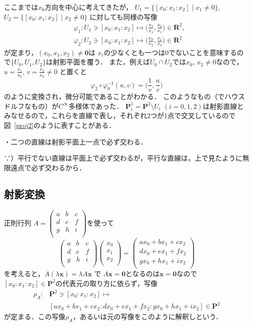 ここまでは$x_0$方向を中心に考えてきたが，
$U_1=\{[x_0:x_1:x_2]\mid x_1\neq 0\}$, $U_2=\{[x_0:x_1:x_2]\mid x_2\neq 0\}$ に対しても同様の写像
\[
\begin{split}
	&\varphi_1:U_1\ni [x_0:x_1:x_2]
	\mapsto 
	\biggl(\frac{x_0}{x_1},\frac{x_2}{x_1}\biggr)\in \mathbf R^2,\\
	&\varphi_2:U_2\ni [x_0:x_1:x_2]
	\mapsto 
	\biggl(\frac{x_0}{x_2},\frac{x_1}{x_2}\biggr)\in \mathbf R^2
\end{split}
\]
が定まり，$(x_0,x_1,x_2)\neq \mathbf 0$は $x_i$の少なくとも一つは$0$でないことを意味するので$\{U_0, U_1, U_2\}$は射影平面を覆う．
また，例えば$U_0\cap U_2$では$x_0$, $x_2\neq 0$なので，
 $u=\frac{x_1}{x_0}$, $v=\frac{x_2}{x_0}\neq 0$ と置くと
\[
	\varphi_2\circ\varphi_0^{-1}(u,v)
	=
	\biggl(\frac{1}{v},\frac{u}{v}\biggr)
\]
のように変換され，微分可能であることがわかる．
このようなもの（でハウスドルフなもの）が$C^\infty$多様体であった．
$\mathbf P^1_i=\mathbf P^2\setminus U_i$ $(i=0,1,2)$は射影直線とみなせるので，これらを直線で表し，それぞれ2つが1点で交叉しているので図~\ref{proj2}のように表すことがある．
\emptyline

・二つの直線は射影平面上一点で必ず交わる．

∵）平行でない直線は平面上で必ず交わるが，平行な直線は，上で見たように無限遠点で必ず交わるから．

\subsection{射影変換}\label{projTransf}
正則行列
$A=\begin{pmatrix}
    	    	a&b&c\\
    		d&e&f\\
    		g&h&i\\
 	\end{pmatrix}$を使って
\[
	\begin{pmatrix}
    	    	a&b&c\\
    		d&e&f\\
    		g&h&i\\
 	\end{pmatrix}
	\begin{pmatrix}
    	    	 x_0\\
    		 x_1\\
    		 x_2\\
 	\end{pmatrix}
	=
	\begin{pmatrix}
    	    	 ax_0+bx_1+cx_2\\
    		 dx_0+ex_1+fx_2\\
    		 gx_0+hx_1+ix_2\\
 	\end{pmatrix}
\]
を考えると，$A(\lambda\mathbf x)=\lambda A\mathbf x$ で
$A\mathbf x=\mathbf 0$となるのは$\mathbf x=\mathbf 0$なので
$[x_0:x_1:x_2]\in \mathbf P^2$の代表元の取り方に依らず，写像
\[
\begin{split}
	\rho_A:&\mathbf P^2\ni [x_0:x_1:x_2]\mapsto\\
	&[ax_0+bx_1+cx_2:dx_0+ex_1+fx_2:gx_0+hx_1+ix_2]\in \mathbf P^2
\end{split}
\]
が定まる．この写像$\rho_A$，あるいは元の写像をこのように解釈しという．
\emptyline

